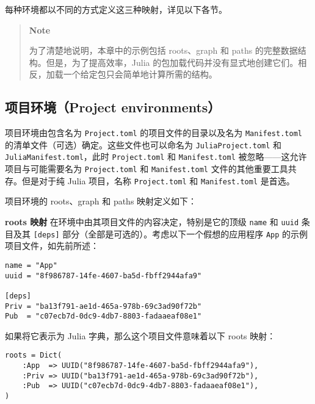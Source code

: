 每种环境都以不同的方式定义这三种映射，详见以下各节。



\begin{quote}
\textbf{Note}

为了清楚地说明，本章中的示例包括 roots、graph 和 paths 的完整数据结构。但是，为了提高效率，Julia 的包加载代码并没有显式地创建它们。相反，加载一个给定包只会简单地计算所需的结构。

\end{quote}


\hypertarget{2089876833496138047}{}


\subsection{项目环境（Project environments）}



项目环境由包含名为 \texttt{Project.toml} 的项目文件的目录以及名为 \texttt{Manifest.toml} 的清单文件（可选）确定。这些文件也可以命名为 \texttt{JuliaProject.toml} 和 \texttt{JuliaManifest.toml}，此时 \texttt{Project.toml} 和 \texttt{Manifest.toml} 被忽略——这允许项目与可能需要名为 \texttt{Project.toml} 和 \texttt{Manifest.toml} 文件的其他重要工具共存。但是对于纯 Julia 项目，名称 \texttt{Project.toml} 和 \texttt{Manifest.toml} 是首选。



项目环境的 roots、graph 和 paths 映射定义如下：



\textbf{roots 映射} 在环境中由其项目文件的内容决定，特别是它的顶级 \texttt{name} 和 \texttt{uuid} 条目及其 \texttt{[deps]} 部分（全部是可选的）。考虑以下一个假想的应用程序 \texttt{App} 的示例项目文件，如先前所述：




\begin{lstlisting}
name = "App"
uuid = "8f986787-14fe-4607-ba5d-fbff2944afa9"

[deps]
Priv = "ba13f791-ae1d-465a-978b-69c3ad90f72b"
Pub  = "c07ecb7d-0dc9-4db7-8803-fadaaeaf08e1"
\end{lstlisting}



如果将它表示为 Julia 字典，那么这个项目文件意味着以下 roots 映射：




\begin{verbatim}
roots = Dict(
    :App  => UUID("8f986787-14fe-4607-ba5d-fbff2944afa9"),
    :Priv => UUID("ba13f791-ae1d-465a-978b-69c3ad90f72b"),
    :Pub  => UUID("c07ecb7d-0dc9-4db7-8803-fadaaeaf08e1"),
)
\end{verbatim}




